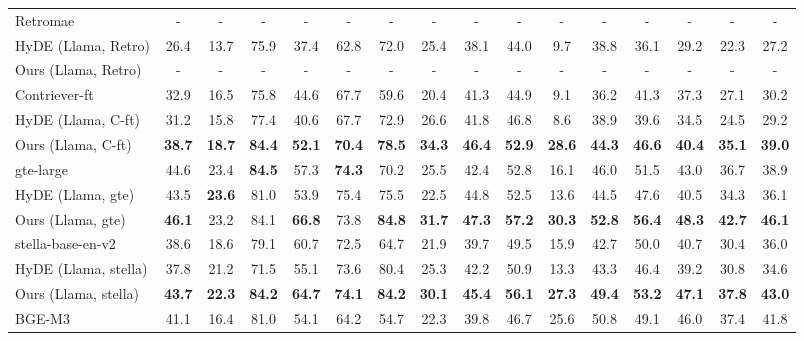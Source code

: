 \begin{table*}[ht]
{\begin{tabular}{l|cccccccc|c|ccccc|c}
        Retromae & - & - & - & - & - & - & - & - & - & - & - & - & - & - & - \\
        HyDE (Llama, Retro) & 26.4 & 13.7 & 75.9 & 37.4 & 62.8 & 72.0 & 25.4 & 38.1 & 44.0 & 9.7 & 38.8 & 36.1 & 29.2 & 22.3 & 27.2 \\
        Ours (Llama, Retro) & - & - & - & - & - & - & - & - & - & - & - & - & - & - & - \\
        \midrule
        Contriever-ft & 32.9 & 16.5 & 75.8 & 44.6 & 67.7 & 59.6 & 20.4 & 41.3 & 44.9 & 9.1 & 36.2 & 41.3 & 37.3 & 27.1 & 30.2 \\
        HyDE (Llama, C-ft) & 31.2 & 15.8 & 77.4 & 40.6 & 67.7 & 72.9 & 26.6 & 41.8 & 46.8 & 8.6 & 38.9 & 39.6 & 34.5 & 24.5 & 29.2 \\
        Ours (Llama, C-ft) & \textbf{38.7} & \textbf{18.7} & \textbf{84.4} & \textbf{52.1} & \textbf{70.4} & \textbf{78.5} & \textbf{34.3} & \textbf{46.4} & \textbf{52.9} & \textbf{28.6} & \textbf{44.3} & \textbf{46.6} & \textbf{40.4} & \textbf{35.1} & \textbf{39.0} \\
        \midrule
        gte-large & 44.6 & 23.4 & \textbf{84.5} & 57.3 & \textbf{74.3} & 70.2 & 25.5 & 42.4 & 52.8 & 16.1 & 46.0 & 51.5 & 43.0 & 36.7 & 38.9 \\
        HyDE (Llama, gte) & 43.5 & \textbf{23.6} & 81.0 & 53.9 & 75.4 & 75.5 & 22.5 & 44.8 & 52.5 & 13.6 & 44.5 & 47.6 & 40.5 & 34.3 & 36.1 \\
        Ours (Llama, gte) & \textbf{46.1} & 23.2 & 84.1 & \textbf{66.8} & 73.8 & \textbf{84.8} & \textbf{31.7} & \textbf{47.3} & \textbf{57.2} & \textbf{30.3} & \textbf{52.8} & \textbf{56.4} & \textbf{48.3} & \textbf{42.7} & \textbf{46.1} \\
        \midrule
        stella-base-en-v2 & 38.6 & 18.6 & 79.1 & 60.7 & 72.5 & 64.7 & 21.9 & 39.7 & 49.5 & 15.9 & 42.7 & 50.0 & 40.7 & 30.4 & 36.0 \\
        HyDE (Llama, stella) & 37.8 & 21.2 & 71.5 & 55.1 & 73.6 & 80.4 & 25.3 & 42.2 & 50.9 & 13.3 & 43.3 & 46.4 & 39.2 & 30.8 & 34.6 \\
        Ours (Llama, stella) & \textbf{43.7} & \textbf{22.3} & \textbf{84.2} & \textbf{64.7} & \textbf{74.1} & \textbf{84.2} & \textbf{30.1} & \textbf{45.4} & \textbf{56.1} & \textbf{27.3} & \textbf{49.4} & \textbf{53.2} & \textbf{47.1} & \textbf{37.8} & \textbf{43.0} \\
        \midrule
        BGE-M3 & 41.1 & 16.4 & 81.0 & 54.1 & 64.2 & 54.7 & 22.3 & 39.8 & 46.7 & 25.6 & 50.8 & 49.1 & 46.0 & 37.4 & 41.8 \\

\end{tabular}}
\end{table*}
